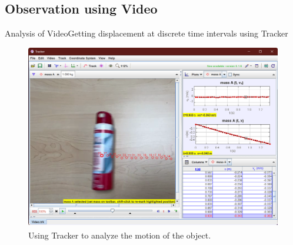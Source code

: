 \documentclass{beamer}
\begin{document}
\subsection{Observation using Video}
\begin{frame}{Analysis of Video}{Getting displacement at discrete time intervals using Tracker}
\begin{figure}
\centering
    \includegraphics[height=0.7\textheight]{res/trackerScreenShot}
    \caption{Using Tracker\textsuperscript{\textregistered} to analyze the motion of the object.}
    \label{fig:trackerSS}
\end{figure}
\end{frame}
\end{document}
